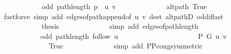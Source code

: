 \begin{isabellebody}
\ \ \ \ \ \ \ \ \ \ \isamarkupfalse%
\ {\isachardoublequoteopen}odd\ {\isacharparenleft}{\kern0pt}path{\isacharunderscore}{\kern0pt}length\ {\isacharparenleft}{\kern0pt}p\ {\isacharat}{\kern0pt}\ {\isacharbrackleft}{\kern0pt}u{\isacharcomma}{\kern0pt}\ v{\isacharbrackright}{\kern0pt}{\isacharparenright}{\kern0pt}{\isacharparenright}{\kern0pt}{\isachardoublequoteclose}\isanewline
\ \ \ \ \ \ \ \ \ \ \ \ \isamarkupfalse%
\ alt{\isacharunderscore}{\kern0pt}path\ True\isanewline
\ \ \ \ \ \ \ \ \ \ \ \ \isamarkupfalse%
\ {\isacharparenleft}{\kern0pt}fastforce\ simp\ add{\isacharcolon}{\kern0pt}\ edges{\isacharunderscore}{\kern0pt}of{\isacharunderscore}{\kern0pt}path{\isacharunderscore}{\kern0pt}append{\isacharunderscore}{\kern0pt}{}{\isacharbrackleft}{\kern0pt}of\ {\isachardoublequoteopen}{\isacharbrackleft}{\kern0pt}u{\isacharcomma}{\kern0pt}\ v{\isacharbrackright}{\kern0pt}{\isachardoublequoteclose}{\isacharbrackright}{\kern0pt}\ dest{\isacharcolon}{\kern0pt}\ alt{\isacharunderscore}{\kern0pt}pathD{\isacharparenleft}{\kern0pt}{}{\isacharparenright}{\kern0pt}\ odd{\isacharunderscore}{\kern0pt}if{\isacharunderscore}{\kern0pt}last{\isacharparenright}{\kern0pt}\isanewline
\ \ \ \ \ \ \ \ \ \ \isamarkupfalse%
\ {\isacharquery}{\kern0pt}thesis\isanewline
\ \ \ \ \ \ \ \ \ \ \ \ \isamarkupfalse%
\ {\isacharparenleft}{\kern0pt}simp\ add{\isacharcolon}{\kern0pt}\ edges{\isacharunderscore}{\kern0pt}of{\isacharunderscore}{\kern0pt}path{\isacharunderscore}{\kern0pt}length{\isacharparenright}{\kern0pt}\isanewline
\ \ \ \ \ \ \ \ \isamarkupfalse%
\isanewline
\ \ \ \ \ \ \ \ \isamarkupfalse%
\ \isamarkupfalse%
\ {\isachardoublequoteopen}odd\ {\isacharparenleft}{\kern0pt}path{\isacharunderscore}{\kern0pt}length\ {\isacharparenleft}{\kern0pt}follow\ u{\isacharparenright}{\kern0pt}{\isacharparenright}{\kern0pt}{\isachardoublequoteclose}\isanewline
\ \ \ \ \ \ \ \ \isamarkupfalse%
\ {\isacharminus}{\kern0pt}\isanewline
\ \ \ \ \ \ \ \ \ \ \isamarkupfalse%
\ {\isachardoublequoteopen}P\ G{}\ u\ v{\isachardoublequoteclose}\isanewline
\ \ \ \ \ \ \ \ \ \ \ \ \isamarkupfalse%
\ True\isanewline
\ \ \ \ \ \ \ \ \ \ \ \ \isamarkupfalse%
\ {\isacharparenleft}{\kern0pt}simp\ add{\isacharcolon}{\kern0pt}\ P{\isacharunderscore}{\kern0pt}P{\isacharprime}{\kern0pt}{\isacharprime}{\kern0pt}{\isacharunderscore}{\kern0pt}cong{\isacharbrackleft}{\kern0pt}symmetric{\isacharbrackright}{\kern0pt}{\isacharparenright}{\kern0pt}\isanewline

\end{isabellebody}
